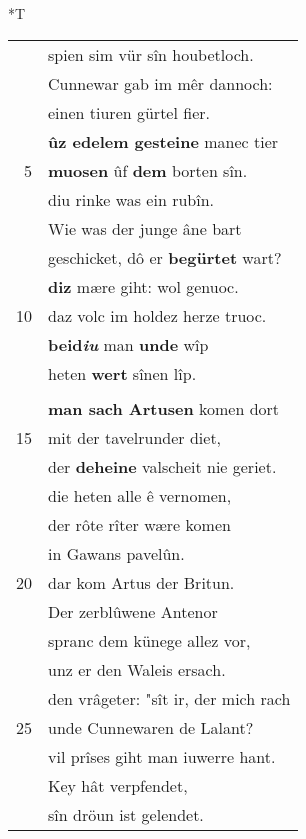 \documentclass[8pt,a4paper,notitlepage]{article}
\begin{document}
\begin{table}[ht]
\begin{minipage}[t]{0.5\linewidth}
\end{minipage}
\hspace{0.5cm}
\begin{minipage}[t]{0.5\linewidth}
\small
\begin{center}*T
\end{center}
\begin{tabular}{rl}
 & spien sim vür sîn houbetloch.\\ 
 & Cunnewar gab im mêr dannoch:\\ 
 & einen tiuren gürtel fier.\\ 
 & \textbf{ûz edelem gesteine} manec tier\\ 
5 & \textbf{muosen} ûf \textbf{dem} borten sîn.\\ 
 & diu rinke was ein rubîn.\\ 
 & Wie was der junge âne bart\\ 
 & geschicket, dô er \textbf{begürtet} wart?\\ 
 & \textbf{diz} mære giht: wol genuoc.\\ 
10 & daz volc im holdez herze truoc.\\ 
 & \textbf{beid\textit{iu}} man \textbf{unde} wîp\\ 
 & heten \textbf{wert} sînen lîp.\\ 
 & \textbf{\begin{large}D\end{large}er künec} messe hete gehôrt.\\ 
 & \textbf{man sach Artusen} komen dort\\ 
15 & mit der tavelrunder diet,\\ 
 & der \textbf{deheine} valscheit nie geriet.\\ 
 & die heten alle ê vernomen,\\ 
 & der rôte rîter wære komen\\ 
 & in Gawans pavelûn.\\ 
20 & dar kom Artus der Britun.\\ 
 & Der zerblûwene Antenor\\ 
 & spranc dem künege allez vor,\\ 
 & unz er den Waleis ersach.\\ 
 & den vrâgeter: "sît ir, der mich rach\\ 
25 & unde Cunnewaren de Lalant?\\ 
 & vil prîses giht man iuwerre hant.\\ 
 & Key hât verpfendet,\\ 
 & sîn dröun ist gelendet.\\ 

\end{tabular}
\end{minipage}
\end{table}
\end{document}
